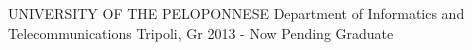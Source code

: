 


\begin{cventries}


\cventry
{UNIVERSITY OF THE PELOPONNESE } %
{Department of Informatics and Telecommunications } %
{Tripoli, Gr} %
{2013 - Now} %
{Pending Graduate}








\end{cventries}
